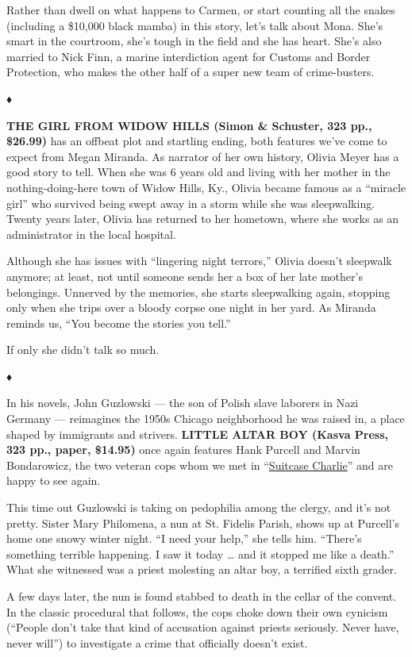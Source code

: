 Rather than dwell on what happens to Carmen, or start counting all the
snakes (including a \$10,000 black mamba) in this story, let's talk
about Mona. She's smart in the courtroom, she's tough in the field and
she has heart. She's also married to Nick Finn, a marine interdiction
agent for Customs and Border Protection, who makes the other half of a
super new team of crime-busters.

♦

\textbf{THE GIRL FROM WIDOW HILLS (Simon \& Schuster, 323 pp., \$26.99)}
has an offbeat plot and startling ending, both features we've come to
expect from Megan Miranda. As narrator of her own history, Olivia Meyer
has a good story to tell. When she was 6 years old and living with her
mother in the nothing-doing-here town of Widow Hills, Ky., Olivia became
famous as a ``miracle girl'' who survived being swept away in a storm
while she was sleepwalking. Twenty years later, Olivia has returned to
her hometown, where she works as an administrator in the local hospital.

Although she has issues with ``lingering night terrors,'' Olivia doesn't
sleepwalk anymore; at least, not until someone sends her a box of her
late mother's belongings. Unnerved by the memories, she starts
sleepwalking again, stopping only when she trips over a bloody corpse
one night in her yard. As Miranda reminds us, ``You become the stories
you tell.''

If only she didn't talk so much.

♦

In his novels, John Guzlowski --- the son of Polish slave laborers in
Nazi Germany --- reimagines the 1950s Chicago neighborhood he was raised
in, a place shaped by immigrants and strivers. \textbf{LITTLE ALTAR BOY
(Kasva Press, 323 pp., paper, \$14.95)} once again features Hank Purcell
and Marvin Bondarowicz, the two veteran cops whom we met in
``\href{https://www.nytimes.com/2018/11/30/books/review/louise-penny-kingdom-of-the-blind.html}{Suitcase
Charlie}'' and are happy to see again.

This time out Guzlowski is taking on pedophilia among the clergy, and
it's not pretty. Sister Mary Philomena, a nun at St. Fidelis Parish,
shows up at Purcell's home one snowy winter night. ``I need your help,''
she tells him. ``There's something terrible happening. I saw it today
\ldots{} and it stopped me like a death.'' What she witnessed was a
priest molesting an altar boy, a terrified sixth grader.

A few days later, the nun is found stabbed to death in the cellar of the
convent. In the classic procedural that follows, the cops choke down
their own cynicism (``People don't take that kind of accusation against
priests seriously. Never have, never will'') to investigate a crime that
officially doesn't exist.

